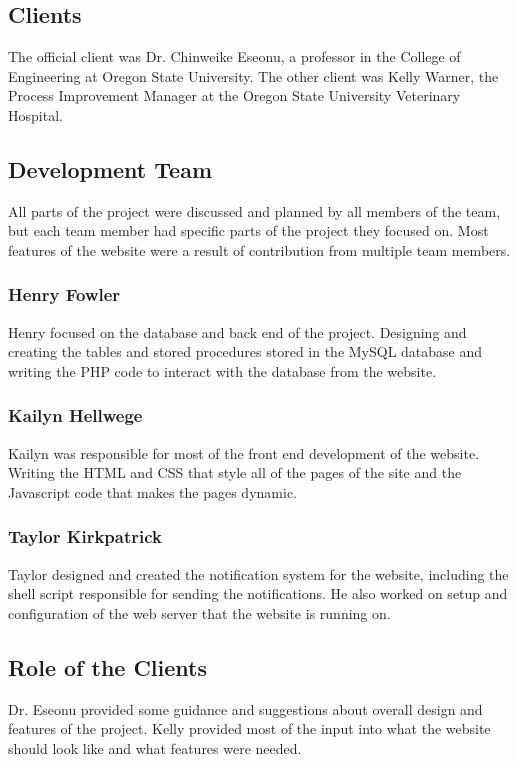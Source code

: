 \documentclass[onecolumn, draftclsnofoot,10pt, compsoc]{IEEEtran}
\begin{document}
\subsection{Clients}
The official client was Dr. Chinweike Eseonu, a professor in the College of Engineering at Oregon State University. The other client was Kelly Warner, the Process Improvement Manager at the Oregon State University Veterinary Hospital.

\subsection{Development Team}
All parts of the project were discussed and planned by all members of the team, but each team member had specific parts of the project they focused on. Most features of the website were a result of contribution from multiple team members.

\subsubsection {Henry Fowler}
Henry focused on the database and back end of the project. Designing and creating the tables and stored procedures stored in the MySQL database and writing the PHP code to interact with the database from the website.

\subsubsection {Kailyn Hellwege}
Kailyn was responsible for most of the front end development of the website. Writing the HTML and CSS that style all of the pages of the site and the Javascript code that makes the pages dynamic.

\subsubsection {Taylor Kirkpatrick}
Taylor designed and created the notification system for the website, including the shell script responsible for sending the notifications. He also worked on setup and configuration of the web server that the website is running on.

\subsection{Role of the Clients}
Dr. Eseonu provided some guidance and suggestions about overall design and features of the project. Kelly provided most of the input into what the website should look like and what features were needed.
\end{document}
